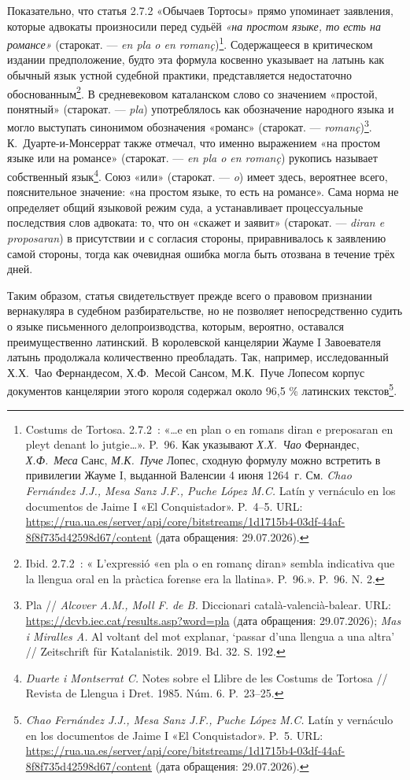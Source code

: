 Показательно, что статья 2.7.2 «Обычаев Тортосы» прямо упоминает заявления, которые адвокаты произносили перед судьёй \emph{«на простом языке, то есть на романсе» }(старокат. --- \emph{en pla o en romanç})\footnote{Costums de Tortosa. 2.7.2~: «…e en plan o en romans diran e preposaran en pleyt denant lo jutgie…». P.~96. Как указывают \emph{Х.Х.~Чао} Фернандес, \emph{Х.Ф.~Меса} Санс, \emph{М.К.~Пуче} Лопес, сходную формулу можно встретить в привилегии Жауме I, выданной Валенсии 4 июня 1264~г. См. \emph{Chao Fernández J.J., Mesa Sanz J.F., Puche López M.C.} Latín y vernáculo en los documentos de Jaime I «El Conquistador». P.~4--5. URL: \url{https://rua.ua.es/server/api/core/bitstreams/1d1715b4-03df-44af-8f8f735d42598d67/content} (дата обращения: 29.07.2026).}. Содержащееся в критическом издании предположение, будто эта формула косвенно указывает на латынь как обычный язык устной судебной практики, представляется недостаточно обоснованным\footnote{Ibid. 2.7.2~: « L’expressió «en pla o en romanç diran» sembla indicativa que la llengua oral en la pràctica forense era la llatina». P.~96.». P.~96. N. 2.}. В средневековом каталанском слово со значением «простой, понятный» (старокат. --- \emph{pla}) употреблялось как обозначение народного языка и могло выступать синонимом обозначения «романс» (старокат. --- \emph{romanç})\footnote{Pla // \emph{Alcover A.M., Moll F. de B.}\emph{ }Diccionari català-valencià-balear. URL: \url{https://dcvb.iec.cat/results.asp?word=pla} (дата обращения: 29.07.2026); \emph{Mas i Miralles A. }Al voltant del mot explanar, ‘passar d’una llengua a una altra’ // Zeitschrift für Katalanistik. 2019. Bd. 32. S. 192.}. К.~Дуарте-и-Монсеррат также отмечал, что именно выражением «на простом языке или на романсе» (старокат. --- \emph{en pla o en romanç}) рукопись называет собственный язык\footnote{\emph{Duarte i Montserrat C.} Notes sobre el Llibre de les Costums de Tortosa // Revista de Llengua i Dret. 1985. Núm. 6. P.~23--25.}. Союз «или» (старокат. --- \emph{o}) имеет здесь, вероятнее всего, пояснительное значение: «на простом языке, то есть на романсе». Сама норма не определяет общий языковой режим суда, а устанавливает процессуальные последствия слов адвоката: то, что он «скажет и заявит» (старокат. --- \emph{diran e proposaran}) в присутствии и с согласия стороны, приравнивалось к заявлению самой стороны, тогда как очевидная ошибка могла быть отозвана в течение трёх дней.

Таким образом, статья свидетельствует прежде всего о правовом признании вернакуляра в судебном разбирательстве, но не позволяет непосредственно судить о языке письменного делопроизводства, которым, вероятно, оставался преимущественно латинский. В королевской канцелярии Жауме I Завоевателя латынь продолжала количественно преобладать. Так, например, исследованный Х.Х.~Чао Фернандесом, Х.Ф.~Месой Сансом, М.К.~Пуче Лопесом корпус документов канцелярии этого короля содержал около 96,5 \% латинских текстов\footnote{\emph{Chao Fernández J.J., Mesa Sanz J.F., Puche López M.C.} Latín y vernáculo en los documentos de Jaime I «El Conquistador». P.~5. URL: \url{https://rua.ua.es/server/api/core/bitstreams/1d1715b4-03df-44af-8f8f735d42598d67/content} (дата обращения: 29.07.2026).}.

